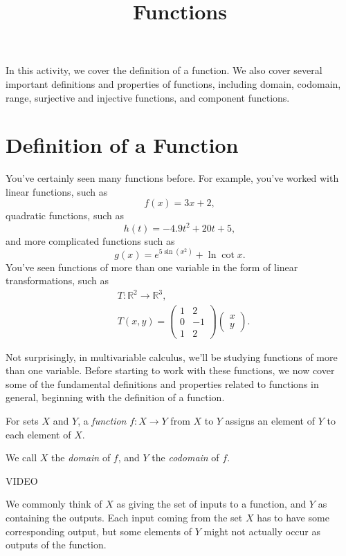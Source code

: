 \documentclass{ximera}
\title{Functions}
\begin{document}
\begin{abstract}
\end{abstract}
\maketitle

In this activity, we cover the definition of a function. We also cover several important definitions and properties of functions, including domain, codomain, range, surjective and injective functions, and component functions.

\section*{Definition of a Function}

You've certainly seen many functions before. For example, you've worked with linear functions, such as
\[
f(x) = 3x+2,
\]
quadratic functions, such as
\[
h(t) = -4.9t^2 + 20t + 5,
\]
and more complicated functions such as
\[
g(x) = e^{5\sin(x^2)}+\ln \cot x.
\]
You've seen functions of more than one variable in the form of linear transformations, such as
\begin{align*}
&T:\mathbb{R}^2\rightarrow\mathbb{R}^3,\\
&T(x,y) = \left(\begin{array}{cc}
1 & 2\\
0 & -1\\
1 & 2
\end{array}\right)
\left(\begin{array}{c}
x\\
y
\end{array}\right).
\end{align*}

Not surprisingly, in multivariable calculus, we'll be studying functions of more than one variable. Before starting to work with these functions, we now cover some of the fundamental definitions and properties related to functions in general, beginning with the definition of a function.

\begin{definition}
For sets $X$ and $Y$, a \emph{function} $f:X\rightarrow Y$ from $X$ to $Y$ assigns an element of $Y$ to each element of $X$.

We call $X$ the \emph{domain} of $f$, and $Y$ the \emph{codomain} of $f$.
\end{definition}

VIDEO

We commonly think of $X$ as giving the set of inputs to a function, and $Y$ as containing the outputs. Each input coming from the set $X$ has to have some corresponding output, but some elements of $Y$ might not actually occur as outputs of the function.
\end{document}
